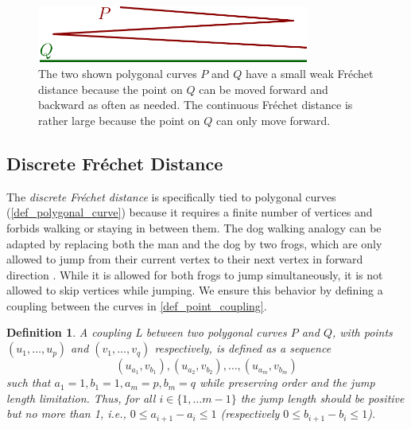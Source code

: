 \documentclass[
oneside,
fontsize=11pt
]{scrartcl}
\newtheorem{mydef}{Definition}
\begin{document}
\begin{figure}[ht]
  \centering
  \includegraphics[width=0.8\textwidth]{images/frechet_distance/weak-frechet-distance-example.pdf}
  \caption{
    The two shown polygonal curves $P$ and $Q$ have a small weak Fréchet distance 
    because the point on $Q$ can be moved forward and backward as often as needed. 
    The continuous Fréchet distance is rather large 
    because the point on $Q$ can only move forward.}
  \label{fig_weak_frechet_distance}
\end{figure}



\subsection{Discrete Fréchet Distance}
The \textit{discrete Fréchet distance} is specifically tied to 
polygonal curves (\autoref{def_polygonal_curve}) 
because it requires a finite number of vertices 
and forbids walking or staying in between them.
The dog walking analogy can be adapted by replacing both the man and the dog by two frogs,
which are only allowed to jump from their current vertex to their next 
vertex in forward direction \cite{bringmann_why_2014}.
While it is allowed for both frogs to jump simultaneously,
it is not allowed to skip vertices while jumping. 
We ensure this behavior by defining a coupling between the curves in \autoref{def_point_coupling}.

\begin{mydef}
  \label{def_point_coupling}
  A \textit{coupling} L between two polygonal curves $P$ and $Q$, 
  with points $(u_1, \dots, u_p)$ and $(v_1, \dots, v_q)$ respectively, 
  is defined as a sequence
  $$(u_{a_1}, v_{b_1}),(u_{a_2}, v_{b_2}), \dots, (u_{a_m}, v_{b_m})$$
  such that $a_1 = 1, b_1 = 1, a_m = p, b_m = q$ 
  while preserving order and the jump length limitation.
  Thus, for all $i \in \{1, \dots m-1\}$
  the jump length should be positive but no more than 1,
  i.e., $0 \leq a_{i+1} - a_i \leq 1$ (respectively $0 \leq b_{i+1} - b_i \leq 1$).
\end{mydef}
\end{document}
